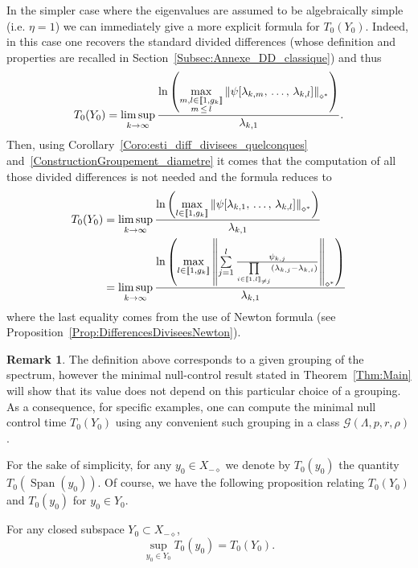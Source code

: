 \documentclass[10pt]{amsart}
\theoremstyle{definition}\newtheorem{defi}[theo]{Definition}\newtheorem{rema}[theo]{Remark}\newtheorem{exam}[theo]{Example}\newtheorem{exem}[theo]{Example}\newtheorem{nota}[theo]{Notation}
\newcommand{\llbracket}{\mathopen{[\mkern -2.7mu[}}
\newcommand{\rrbracket}{\mathclose{]\mkern -2.7mu]}}
\newcommand{\inter}[2]{\llbracket #1,#2 \rrbracket}
\newcommand{\interexclu}[3]{\llbracket #1,#2\rrbracket_{\neq #3}}
\newcommand{\Xmalpha}{X_{-\diamond}}
\newcommand{\Fzp}{Y_0}
\newcommand{\normeXalphas}[1]{\left\| #1 \right\|_{\diamond^*}}
\newcommand{\n}{g}
\DeclareMathOperator{\Span}{Span}
\begin{document}
In the simpler case where the eigenvalues are assumed to be algebraically simple (i.e. $\eta =1$) we can immediately give a more explicit formula for $T_0(\Fzp)$. Indeed, in this case one recovers the standard divided differences (whose definition and properties are recalled in Section~\ref{Subsec:Annexe_DD_classique}) and thus
\begin{equation}\label{Def:TempsMinimal_DifferencesDivisees_casgeneral}
T_0(\Fzp) = \limsup_{k\to \infty} \frac{\ln \left(\max\limits_{\substack{m,l\in \inter{1}{\n_k} \\ m\,\leq\,l}} \normeXalphas{ \psi[\lambda_{k,m},\,\dots,\,\lambda_{k,l}] } \right)}{\lambda_{k,1}}.
\end{equation}
Then, using Corollary~\ref{Coro:esti_diff_divisees_quelconques} and~\eqref{ConstructionGroupement_diametre} it comes that the computation of all those divided differences is not needed and the formula reduces to
\begin{align}\label{Def:TempsMinimal_DifferencesDivisees}
T_0 (\Fzp) &= \limsup_{k \to \infty} \frac{\ln \left(\max\limits_{l\in \inter{1}{\n_k}} \normeXalphas{ \psi[\lambda_{k,1},\, \dots,\,\lambda_{k,l}] } \right)}{\lambda_{k,1}}
\\
&=\limsup_{k\to \infty} \frac{\ln \left(\max\limits_{l\in \inter{1}{\n_k}} \normeXalphas{\sum\limits_{j=1}^l \frac{ \psi_{k,j} }{\prod\limits_{i\in \interexclu{1}{l}{j}} (\lambda_{k,j}-\lambda_{k,i})} } \right)}{\lambda_{k,1}}\label{Def:T0}
\end{align}
where the last equality comes from the use of Newton formula (see Proposition~\ref{Prop:DifferencesDiviseesNewton}).



\begin{rema}
The definition above corresponds to a given grouping of the spectrum, however the minimal null-control result stated in Theorem~\ref{Thm:Main} will show that its value does not depend on this particular choice of a grouping. As a consequence, for specific examples, one can compute the minimal null control time $T_0(\Fzp)$ using any convenient such grouping in a class $\mathcal{G}(\Lambda,p,r,\rho)$.
\end{rema}


For the sake of simplicity, for any $y_0 \in \Xmalpha$ we denote by $T_0(y_0)$ the quantity $T_0(\Span(y_0))$. Of course, we have the following proposition relating $T_0(\Fzp)$ and $T_0(y_0)$ for $y_0 \in \Fzp$.

\begin{prop}\label{Prop:Sup_TempsMinimaux}
For any closed subspace $\Fzp \subset \Xmalpha$,
\[
\sup_{y_0 \in \Fzp} T_0(y_0) = T_0(\Fzp).
\]
\end{prop}
\end{document}
